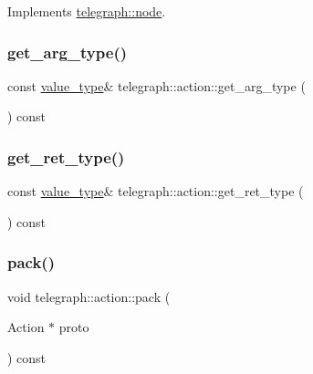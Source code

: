 Implements \hyperlink{classtelegraph_1_1node_a68c4aed1434da1f0ece9089ff99ffcdb}{telegraph\+::node}.

\mbox{\label{classtelegraph_1_1action_a5d2e7bef5432f1246912f07296dfb4f1}} 
\subsubsection{\texorpdfstring{get\+\_\+arg\+\_\+type()}{get\_arg\_type()}}
{\footnotesize\ttfamily const \hyperlink{classtelegraph_1_1value__type}{value\+\_\+type}\& telegraph\+::action\+::get\+\_\+arg\+\_\+type (\begin{DoxyParamCaption}{ }\end{DoxyParamCaption}) const\hspace{0.3cm}{\ttfamily [inline]}}

\mbox{\label{classtelegraph_1_1action_a3d587001f7779581717b26b91564a5d8}} 
\subsubsection{\texorpdfstring{get\+\_\+ret\+\_\+type()}{get\_ret\_type()}}
{\footnotesize\ttfamily const \hyperlink{classtelegraph_1_1value__type}{value\+\_\+type}\& telegraph\+::action\+::get\+\_\+ret\+\_\+type (\begin{DoxyParamCaption}{ }\end{DoxyParamCaption}) const\hspace{0.3cm}{\ttfamily [inline]}}

\mbox{\label{classtelegraph_1_1action_ab8b73ef00465e76e016c7f44923d4036}} 
\subsubsection{\texorpdfstring{pack()}{pack()}\hspace{0.1cm}{\footnotesize\ttfamily [1/2]}}
{\footnotesize\ttfamily void telegraph\+::action\+::pack (\begin{DoxyParamCaption}\item[{Action $\ast$}]{proto }\end{DoxyParamCaption}) const}

